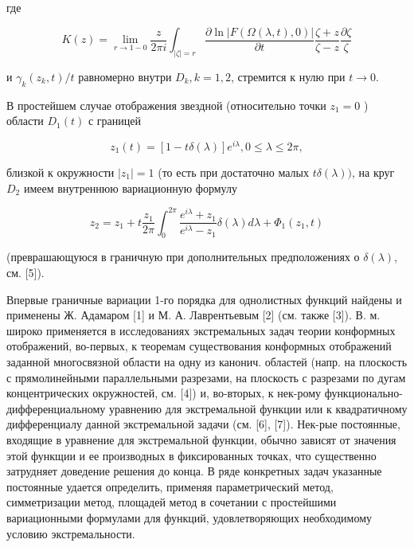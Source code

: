 \documentclass[10pt]{article}
\begin{document}
где



\[

K(z)=\lim _{r \rightarrow 1-0} \frac{z}{2 \pi i} \int_{|\zeta|=r} \frac{\partial \ln |F(\Omega(\lambda, t), 0)|}{\partial t} \frac{\zeta+z}{\zeta-z} \frac{\partial \zeta}{\zeta}

\]



и $\gamma_{k}\left(z_{k}, t\right) / t$ равномерно внутри $D_{k}, k=1,2$, стремится к нулю при $t \rightarrow 0$.



В простейшем случае отображения звездной (относительно точки $z_{1}=0$ ) области $D_{1}(t)$ с границей



\[

z_{1}(t)=[1-t \delta(\lambda)] e^{i \lambda}, 0 \leqslant \lambda \leqslant 2 \pi,

\]



близкой к окружности $\left|z_{1}\right|=1$ (то есть при достаточно малых $t \delta(\lambda))$, на круг $D_{2}$ имеем внутреннюю вариационную формулу



\[

z_{2}=z_{1}+t \frac{z_{1}}{2 \pi} \int_{0}^{2 \pi} \frac{e^{i \lambda}+z_{1}}{e^{i \lambda}-z_{1}} \delta(\lambda) d \lambda+\Phi_{1}\left(z_{1}, t\right)

\]



(преврашающуюся в граничную при дополнительных предположениях о $\delta(\lambda)$, см. [5]).



Впервые граничные вариации 1-го порядка для однолистных функций найдены и применены Ж. Адамаром [1] и М. А. Лаврентьевым [2] (см. также [3]). В. м. широко применяется в исследованиях экстремальных задач теории конформных отображений, во-первых, к теоремам существования конформных отображений заданной многосвязной области на одну из канонич. областей (напр. на плоскость с прямолинейными параллельными разрезами, на плоскость с разрезами по дугам концентрических окружностей, см. [4]) и, во-вторых, к нек-рому функционально-дифференциальному уравнению для экстремальной функции или к квадратичному дифференциалу данной экстремальной задачи (см. [6], [7]). Нек-рые постоянные, входящие в уравнение для экстремальной функции, обычно зависят от значения этой функщии и ее производных в фиксированных точках, что существенно затрудняет доведение решения до конца. В ряде конкретных задач указанные постоянные удается определить, применяя параметрический метод, симметризации метод, площадей метод в сочетании с простейшими вариационными формулами для функций, удовлетворяющих необходимому условию экстремальности.
\end{document}
